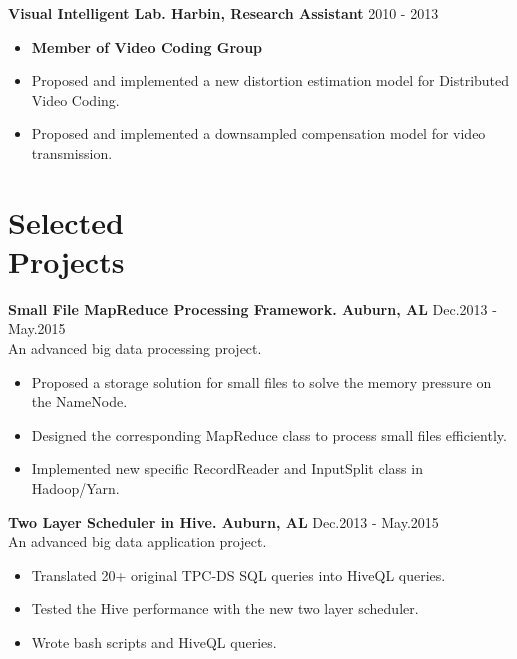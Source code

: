 \documentclass[11pt,margin,line]{res}
\newcommand{\bulletindent}{11pt}
\newcommand{\CC}{C\nolinebreak\hspace{.05em}\raisebox{.4ex}{\tiny\bf +}\nolinebreak\hspace{-.10em}\raisebox{.4ex}{\tiny\bf +}}
\begin{document}
\begin{resume}
{\bf Visual Intelligent Lab. Harbin, Research Assistant}   \hfill 2010 - 2013
    \begin{itemize}[leftmargin=\bulletindent]
        \itemsep -2pt
        \item {\bf Member of Video Coding Group}
        \item Proposed and implemented a new distortion estimation model for Distributed Video Coding.
        \item Proposed and implemented a downsampled compensation model for video transmission.
    \end{itemize}

\section{Selected\\Projects}

    {\bf Small File MapReduce Processing Framework. Auburn, AL}	\hfill   Dec.2013 - May.2015 \\
    An advanced big data processing project.
	\begin{itemize}[leftmargin=\bulletindent]
		\itemsep -2pt
			\item Proposed a storage solution for small files to solve the memory pressure on the NameNode.
    	\item Designed the corresponding MapReduce class to process small files efficiently. 
    	\item Implemented new specific RecordReader and InputSplit class in Hadoop/Yarn.
	\end{itemize}


    {\bf Two Layer Scheduler in Hive. Auburn, AL}	\hfill   Dec.2013 - May.2015 \\
    An advanced big data application project.
	\begin{itemize}[leftmargin=\bulletindent]
		\itemsep -2pt
			\item Translated 20+ original TPC-DS SQL queries into HiveQL queries.
    	\item Tested the Hive performance with the new two layer scheduler. 
    	\item Wrote bash scripts and HiveQL queries.
	\end{itemize}


\end{resume}
\end{document}
